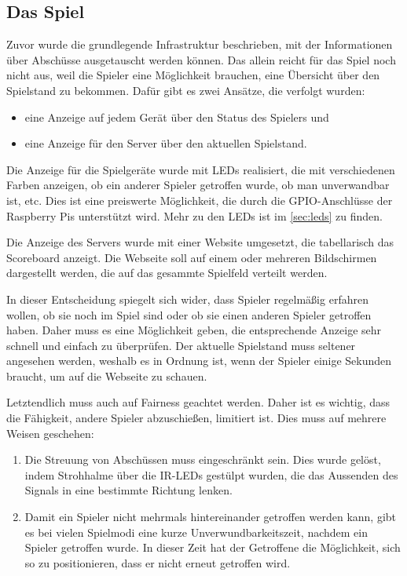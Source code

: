 \subsection{Das Spiel}
Zuvor wurde die grundlegende Infrastruktur beschrieben, mit der Informationen über Abschüsse
ausgetauscht werden können.
Das allein reicht für das Spiel noch nicht aus, weil die Spieler eine Möglichkeit brauchen, eine
Übersicht über den Spielstand zu bekommen.
Dafür gibt es zwei Ansätze, die verfolgt wurden:
\begin{itemize}
  \item
    eine Anzeige auf jedem Gerät über den Status des Spielers und
  \item
    eine Anzeige für den Server über den aktuellen Spielstand.
\end{itemize}
Die Anzeige für die Spielgeräte wurde mit LEDs realisiert, die mit verschiedenen Farben anzeigen, ob
ein anderer Spieler getroffen wurde, ob man unverwandbar ist, etc.
Dies ist eine preiswerte Möglichkeit, die durch die GPIO-Anschlüsse der Raspberry Pis unterstützt
wird.
Mehr zu den LEDs ist im \cref{sec:leds} zu finden.

Die Anzeige des Servers wurde mit einer Website umgesetzt, die tabellarisch das Scoreboard anzeigt.
Die Webseite soll auf einem oder mehreren Bildschirmen dargestellt werden, die auf das gesammte
Spielfeld verteilt werden.

In dieser Entscheidung spiegelt sich wider, dass Spieler regelmäßig erfahren wollen, ob sie noch im
Spiel sind oder ob sie einen anderen Spieler getroffen haben.
Daher muss es eine Möglichkeit geben, die entsprechende Anzeige sehr schnell und einfach zu
überprüfen.
Der aktuelle Spielstand muss seltener angesehen werden, weshalb es in Ordnung ist, wenn der Spieler
einige Sekunden braucht, um auf die Webseite zu schauen.

Letztendlich muss auch auf Fairness geachtet werden.
Daher ist es wichtig, dass die Fähigkeit, andere Spieler abzuschießen, limitiert ist.
Dies muss auf mehrere Weisen geschehen:
\begin{enumerate}
  \item
    Die Streuung von Abschüssen muss eingeschränkt sein.
    Dies wurde gelöst, indem Strohhalme über die IR-LEDs gestülpt wurden, die das Aussenden des
    Signals in eine bestimmte Richtung lenken.
  \item
    Damit ein Spieler nicht mehrmals hintereinander getroffen werden kann, gibt es bei vielen
    Spielmodi eine kurze Unverwundbarkeitszeit, nachdem ein Spieler getroffen wurde.
    In dieser Zeit hat der Getroffene die Möglichkeit, sich so zu positionieren, dass er nicht
    erneut getroffen wird.
\end{enumerate}
